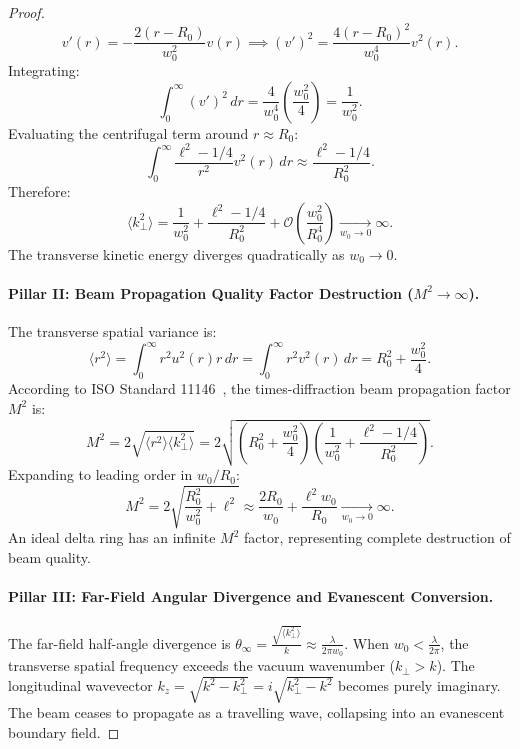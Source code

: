 \documentclass[11pt,a4paper]{article}
\begin{document}
\begin{proof}
\begin{equation}
v'(r) = - \frac{2(r - R_0)}{w_0^2} v(r) \implies (v')^2 = \frac{4(r - R_0)^2}{w_0^4} v^2(r).
\label{eq:v_prime_squared}
\end{equation}
Integrating:
\begin{equation}
\int_0^\infty (v')^2 \, dr = \frac{4}{w_0^4} \left( \frac{w_0^2}{4} \right) = \frac{1}{w_0^2}.
\label{eq:v_prime_integral}
\end{equation}
Evaluating the centrifugal term around $r \approx R_0$:
\begin{equation}
\int_0^\infty \frac{\ell^2 - 1/4}{r^2} v^2(r) \, dr \approx \frac{\ell^2 - 1/4}{R_0^2}.
\label{eq:centrifugal_integral}
\end{equation}
Therefore:
\begin{equation}
\boxed{\langle k_\perp^2 \rangle = \frac{1}{w_0^2} + \frac{\ell^2 - 1/4}{R_0^2} + \mathcal{O}\left( \frac{w_0^2}{R_0^4} \right) \xrightarrow[w_0 \to 0]{} \infty.}
\label{eq:pillar1_result}
\end{equation}
The transverse kinetic energy diverges quadratically as $w_0 \to 0$.

\paragraph{Pillar II: Beam Propagation Quality Factor Destruction ($M^2 \to \infty$).}
The transverse spatial variance is:
\begin{equation}
\langle r^2 \rangle = \int_0^\infty r^2 u^2(r) r \, dr = \int_0^\infty r^2 v^2(r) \, dr = R_0^2 + \frac{w_0^2}{4}.
\label{eq:spatial_variance}
\end{equation}
According to ISO Standard 11146~\cite{ISO11146}, the times-diffraction beam propagation factor $M^2$ is:
\begin{equation}
M^2 = 2 \sqrt{\langle r^2 \rangle \langle k_\perp^2 \rangle} = 2 \sqrt{\left( R_0^2 + \frac{w_0^2}{4} \right)\left( \frac{1}{w_0^2} + \frac{\ell^2 - 1/4}{R_0^2} \right)}.
\label{eq:m2_formula}
\end{equation}
Expanding to leading order in $w_0 / R_0$:
\begin{equation}
\boxed{M^2 = 2 \sqrt{\frac{R_0^2}{w_0^2} + \ell^2} \approx \frac{2 R_0}{w_0} + \frac{\ell^2 w_0}{R_0} \xrightarrow[w_0 \to 0]{} \infty.}
\label{eq:pillar2_result}
\end{equation}
An ideal delta ring has an infinite $M^2$ factor, representing complete destruction of beam quality.

\paragraph{Pillar III: Far-Field Angular Divergence and Evanescent Conversion.}
The far-field half-angle divergence is $\theta_\infty = \frac{\sqrt{\langle k_\perp^2 \rangle}}{k} \approx \frac{\lambda}{2\pi w_0}$. When $w_0 < \frac{\lambda}{2\pi}$, the transverse spatial frequency exceeds the vacuum wavenumber ($k_\perp > k$). The longitudinal wavevector $k_z = \sqrt{k^2 - k_\perp^2} = i \sqrt{k_\perp^2 - k^2}$ becomes purely imaginary. The beam ceases to propagate as a travelling wave, collapsing into an evanescent boundary field.


\end{proof}
\end{document}
